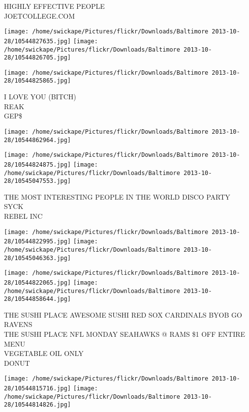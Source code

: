 \documentclass[10pt,letterpaper]{article}
\begin{document}
HIGHLY EFFECTIVE PEOPLE\\
JOETCOLLEGE.COM\\
\pagebreak

\texttt{[image: /home/swickape/Pictures/flickr/Downloads/Baltimore 2013-10-28/10544827635.jpg]}
\texttt{[image: /home/swickape/Pictures/flickr/Downloads/Baltimore 2013-10-28/10544826705.jpg]}

\texttt{[image: /home/swickape/Pictures/flickr/Downloads/Baltimore 2013-10-28/10544825865.jpg]}

I LOVE YOU (BITCH)\\
REAK\\
GEP\$\\
\pagebreak

\texttt{[image: /home/swickape/Pictures/flickr/Downloads/Baltimore 2013-10-28/10544862964.jpg]}

\vspace{0.25in}
\texttt{[image: /home/swickape/Pictures/flickr/Downloads/Baltimore 2013-10-28/10544824875.jpg]}
\texttt{[image: /home/swickape/Pictures/flickr/Downloads/Baltimore 2013-10-28/10545047553.jpg]}

THE MOST INTERESTING PEOPLE IN THE WORLD DISCO PARTY\\
SYCK\\
REBEL INC\\
\pagebreak

\texttt{[image: /home/swickape/Pictures/flickr/Downloads/Baltimore 2013-10-28/10544822995.jpg]}
\texttt{[image: /home/swickape/Pictures/flickr/Downloads/Baltimore 2013-10-28/10545046363.jpg]}

\texttt{[image: /home/swickape/Pictures/flickr/Downloads/Baltimore 2013-10-28/10544822065.jpg]}
\texttt{[image: /home/swickape/Pictures/flickr/Downloads/Baltimore 2013-10-28/10544858644.jpg]}

THE SUSHI PLACE AWESOME SUSHI RED SOX CARDINALS BYOB GO RAVENS\\
THE SUSHI PLACE NFL MONDAY SEAHAWKS @ RAMS \$1 OFF ENTIRE MENU\\
VEGETABLE OIL ONLY\\
DONUT\\
\pagebreak

\texttt{[image: /home/swickape/Pictures/flickr/Downloads/Baltimore 2013-10-28/10544815716.jpg]}
\texttt{[image: /home/swickape/Pictures/flickr/Downloads/Baltimore 2013-10-28/10544814826.jpg]}
\end{document}
